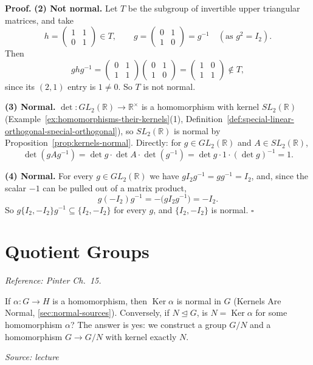 \documentclass[11pt]{report}
\renewenvironment{proof}[1][Proof]{\noindent\textbf{#1.} }{\hfill$\square$\par\vspace{5pt}}
\newcommand{\srcline}[1]{\par\hfill{\footnotesize\textit{Source: #1}}}
\begin{document}
\begin{proof}
\textbf{(2) Not normal.} Let $T$ be the subgroup of invertible upper triangular matrices, and take
\[ h = \begin{pmatrix} 1 & 1 \\ 0 & 1 \end{pmatrix} \in T, \qquad g = \begin{pmatrix} 0 & 1 \\ 1 & 0 \end{pmatrix} = g^{-1} \quad (\text{as } g^2 = I_2). \]
Then
\[ ghg^{-1} = \begin{pmatrix} 0 & 1 \\ 1 & 1 \end{pmatrix}\begin{pmatrix} 0 & 1 \\ 1 & 0 \end{pmatrix} = \begin{pmatrix} 1 & 0 \\ 1 & 1 \end{pmatrix} \notin T, \]
since its $(2,1)$ entry is $1 \neq 0$. So $T$ is not normal.

\textbf{(3) Normal.} $\det: GL_2(\mathbb{R}) \to \mathbb{R}^\times$ is a homomorphism with kernel $SL_2(\mathbb{R})$ (Example~\ref{ex:homomorphisms-their-kernels}(1), Definition~\ref{def:special-linear-orthogonal-special-orthogonal}), so $SL_2(\mathbb{R})$ is normal by Proposition~\ref{prop:kernels-normal}. Directly: for $g \in GL_2(\mathbb{R})$ and $A \in SL_2(\mathbb{R})$,
\[ \det(gAg^{-1}) = \det g \cdot \det A \cdot \det(g^{-1}) = \det g \cdot 1 \cdot (\det g)^{-1} = 1. \]

\textbf{(4) Normal.} For every $g \in GL_2(\mathbb{R})$ we have $gI_2g^{-1} = gg^{-1} = I_2$, and, since the scalar $-1$ can be pulled out of a matrix product,
\[ g(-I_2)g^{-1} = -\big(gI_2g^{-1}\big) = -I_2 . \]
So $g\{I_2, -I_2\}g^{-1} \subseteq \{I_2, -I_2\}$ for every $g$, and $\{I_2, -I_2\}$ is normal.
\end{proof}

\section{Quotient Groups}\label{sec:quotient}

\textit{Reference: Pinter Ch.\ 15.}

\begin{rembox}\label{rem:question}
If $\alpha: G \to H$ is a homomorphism, then $\operatorname{Ker}\alpha$ is normal in $G$ (Kernels Are Normal, \ref{sec:normal-sources}). Conversely, if $N \trianglelefteq G$, is $N = \operatorname{Ker}\alpha$ for some homomorphism $\alpha$? The answer is yes: we construct a group $G/N$ and a homomorphism $G \to G/N$ with kernel exactly $N$.
\srcline{lecture}
\end{rembox}
\end{document}
